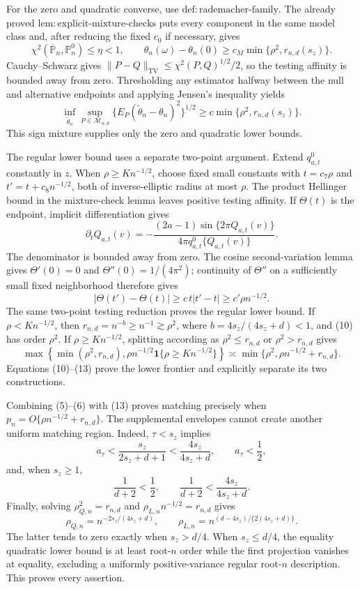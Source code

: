 For the zero and quadratic converse, use \(\mathrm{def{:}rademacher\text{-}family}\). The already proved \(\mathrm{lem{:}explicit\text{-}mixture\text{-}checks}\) puts every component in the same model class and, after reducing the fixed \(c_0\) if necessary, gives
\[
\chi^2(\overline{\mathbb P}_n,\mathbb P_n^0)\le\eta<1,
\qquad
\theta_n(\omega)-\theta_n(0)\ge c_M\min\{\rho^2,r_{n,d}(s_z)\}. \tag{9}
\]
Cauchy--Schwarz gives \(\|P-Q\|_{\mathrm{TV}}\le\chi^2(P,Q)^{1/2}/2\), so the testing affinity is bounded away from zero. Thresholding any estimator halfway between the null and alternative endpoints and applying Jensen's inequality yields
\[
\inf_{\widetilde\theta_n}\sup_{P\in\mathcal M_{n,d}}
\{E_P(\widetilde\theta_n-\theta_n)^2\}^{1/2}
\ge c\min\{\rho^2,r_{n,d}(s_z)\}.                               \tag{10}
\]
This sign mixture supplies only the zero and quadratic lower bounds.

The regular lower bound uses a separate two-point argument. Extend \(q_{a,t}^{0}\) constantly in \(z\). When \(\rho\ge K n^{-1/2}\), choose fixed small constants with \(t=c_7\rho\) and \(t'=t+c_8n^{-1/2}\), both of inverse-elliptic radius at most \(\rho\). The product Hellinger bound in the mixture-check lemma leaves positive testing affinity. If \(\Theta(t)\) is the endpoint, implicit differentiation gives
\[
\partial_tQ_{a,t}(v)
=-\frac{(2a-1)\sin\{2\pi Q_{a,t}(v)\}}
{4\pi q_{a,t}^{0}\{Q_{a,t}(v)\}}.                               \tag{11}
\]
The denominator is bounded away from zero. The cosine second-variation lemma gives \(\Theta'(0)=0\) and \(\Theta''(0)=1/(4\pi^2)\); continuity of \(\Theta''\) on a sufficiently small fixed neighborhood therefore gives
\[
|\Theta(t')-\Theta(t)|\ge c\,t|t'-t|\ge c'\rho n^{-1/2}.        \tag{12}
\]
The same two-point testing reduction proves the regular lower bound. If \(\rho<K n^{-1/2}\), then \(r_{n,d}=n^{-b}\ge n^{-1}\gtrsim\rho^2\), where \(b=4s_z/(4s_z+d)<1\), and (10) has order \(\rho^2\). If \(\rho\ge K n^{-1/2}\), splitting according as \(\rho^2\le r_{n,d}\) or \(\rho^2>r_{n,d}\) gives
\[
\max\!\left\{\min(\rho^2,r_{n,d}),\rho n^{-1/2}\mathbf1\{\rho\ge Kn^{-1/2}\}\right\}
\asymp\min\{\rho^2,\rho n^{-1/2}+r_{n,d}\}.                   \tag{13}
\]
Equations (10)--(13) prove the lower frontier and explicitly separate its two constructions.

Combining (5)--(6) with (13) proves matching precisely when \(p_n=O\{\rho n^{-1/2}+r_{n,d}\}\). The supplemental envelopes cannot create another uniform matching region. Indeed, \(\tau<s_z\) implies
\[
a_\tau<\frac{s_z}{2s_z+d+1}<\frac{4s_z}{4s_z+d},
\qquad a_\tau<\frac12,                                          \tag{14}
\]
and, when \(s_z\ge1\),
\[
\frac1{d+2}<\frac12,
\qquad \frac1{d+2}<\frac{4s_z}{4s_z+d}.                         \tag{15}
\]
Finally, solving \(\rho_{Q,n}^2=r_{n,d}\) and \(\rho_{L,n}n^{-1/2}=r_{n,d}\) gives
\[
\rho_{Q,n}=n^{-2s_z/(4s_z+d)},
\qquad
\rho_{L,n}=n^{(d-4s_z)/\{2(4s_z+d)\}}.                          \tag{16}
\]
The latter tends to zero exactly when \(s_z>d/4\). When \(s_z\le d/4\), the equality quadratic lower bound is at least root-\(n\) order while the first projection vanishes at equality, excluding a uniformly positive-variance regular root-\(n\) description. This proves every assertion.